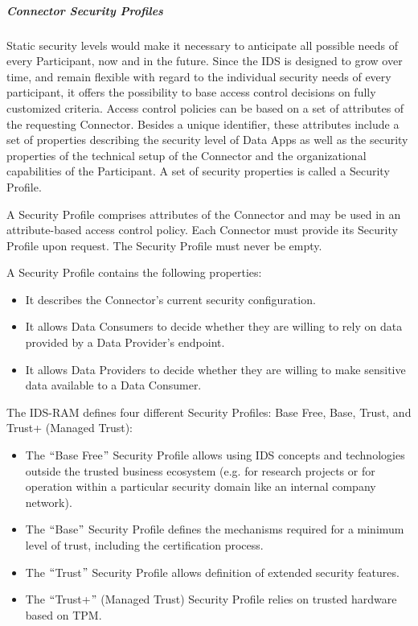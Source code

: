 

\subparagraph*{Connector Security Profiles \\}

Static security levels would make it necessary to anticipate all possible needs of every Participant, now and in the future. Since the IDS is designed to grow over time, and remain flexible with regard to the individual security needs of every participant, it offers the possibility to base access control decisions on fully customized criteria. Access control policies can be based on a set of attributes of the requesting Connector. Besides a unique identifier, these attributes include a set of properties describing the security level of Data Apps as well as the security properties of the technical setup of the Connector and the organizational capabilities of the Participant. A set of security properties is called a Security Profile.



A Security Profile comprises attributes of the Connector and may be used in an attribute-based access control policy. Each Connector must provide its Security Profile upon request. The Security Profile must never be empty.


A Security Profile contains the following properties:
\begin{itemize}
\item  It describes the Connector’s current security configuration.
\item  It allows Data Consumers to decide whether they are willing to rely on data provided by a Data Provider's endpoint.
\item  It allows Data Providers to decide whether they are willing to make sensitive data available to a Data Consumer.
\end{itemize}

The IDS-RAM defines four different Security Profiles: Base Free, Base, Trust, and Trust+ (Managed Trust):

\begin{itemize}
	\item The $``$Base Free$"$  Security Profile allows using IDS concepts and technologies outside the trusted business ecosystem (e.g. for research projects or for operation within a particular security domain like an internal company network). 

	\item The $``$Base$"$  Security Profile defines the mechanisms required for a minimum level of trust, including the certification process. 

	\item The $``$Trust$"$  Security Profile allows definition of extended security features.

	\item The $``$Trust+$"$  (Managed Trust) Security Profile relies on trusted hardware based on TPM. 
\end{itemize}

